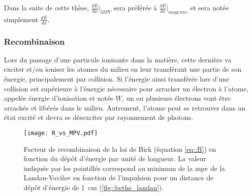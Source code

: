         Dans la suite de cette thèse, $\frac{dE}{dx}\rvert_{MPV}$ sera préférée à $\frac{dE}{dx}\rvert_{moyenne}$ et sera notée simplement $\frac{dE}{dx}$.

      \subsubsection{Recombinaison}

        Lors du passage d'une particule ionisante dans la matière, cette dernière va exciter et/ou ioniser les atomes du milieu en leur transférant une partie de son énergie, principalement par collision. Si l'énergie ainsi transférée lors d'une collision est supérieure à l'énergie nécessaire pour arracher un électron à l'atome, appelée énergie d'ionisation et notée $W$, un ou plusieurs électrons vont être arrachés et libérés dans le milieu. Autrement, l'atome peut se retrouver dans un état excité et devra se désexciter par rayonnement de photons.

        \begin{figure}[htbp]
          \centering
          \texttt{[image: R\_vs\_MPV.pdf]}
          \caption[Facteur de recombinaison de la loi de Birk en fonction du dépôt d'énergie par unité de longueur.]{\label{fig::birk}Facteur de recombinaison de la loi de Birk (équation \eqref{eq::R}) en fonction du dépôt d'énergie par unité de longueur. La valeur indiquée par les pointillés correspond au minimum de la \gls{mpv} de la Landau-Vavilov en fonction de l'impulsion  pour un distance de dépôt d'énergie de \SI{1}{\centi\meter} (\autoref{fig::bethe_landau}).}
        \end{figure}

